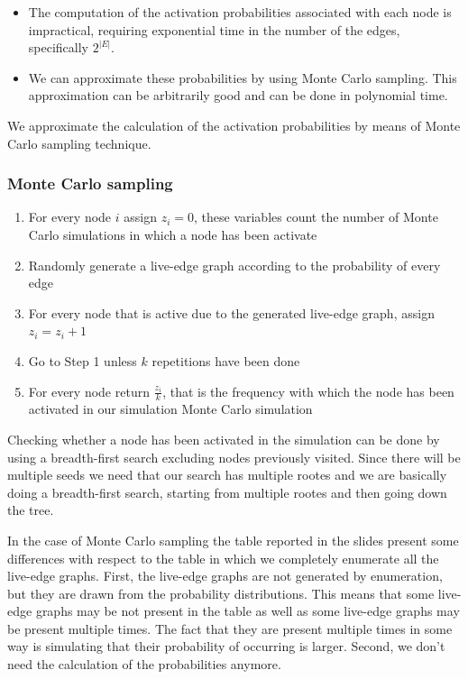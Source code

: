 \documentclass[10pt,a4paper]{article}
\begin{document}
\begin{itemize}

\item The computation of the activation probabilities associated with each node is impractical, requiring exponential time in the number of the edges, specifically $2^{|E|}$.
\item We can approximate these probabilities by using Monte Carlo sampling. This approximation can be arbitrarily good and can be done in polynomial time.
\end{itemize}

We approximate the calculation of the activation probabilities by means of Monte Carlo sampling technique.

\subsubsection{Monte Carlo sampling}\label{monte-carlo-sampling}

\begin{enumerate}
\item For every node $i$ assign $z_i = 0$, these variables count the number of Monte Carlo simulations in which a node has been activate
\item Randomly generate a live-edge graph according to the probability of every edge
\item For every node that is active due to the generated live-edge graph, assign $z_i = z_i + 1$
\item Go to Step 1 unless $k$ repetitions have been done
\item For every node return $\frac{z_i}{k}$, that is the frequency with which the node has been activated in our simulation Monte Carlo simulation
\end{enumerate}

Checking whether a node has been activated in the simulation can be done by using a breadth-first search excluding nodes previously visited. Since there will be multiple seeds we need that our search has multiple rootes and we are basically doing a breadth-first search, starting from multiple rootes and then going down the tree.

In the case of Monte Carlo sampling the table reported in the slides present some differences with respect to the table in which we completely enumerate all the live-edge graphs. First, the live-edge graphs are not generated by enumeration, but they are drawn from the probability distributions. This means that some live-edge graphs may be not present in the table as well as some live-edge graphs may be present multiple times. The fact that they are present multiple times in some way is simulating that their probability of occurring is larger. Second, we don't need the calculation of the probabilities anymore.
\end{document}
